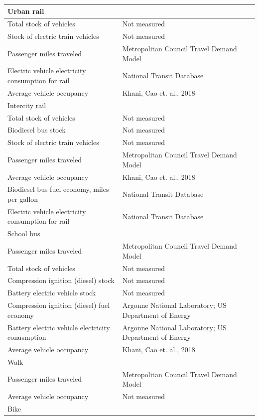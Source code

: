 \documentclass[
]{book}
\begin{document}
\begin{longtable}{ll}
\midrule
\multicolumn{2}{l}{Urban rail} \\ 
\midrule
Total stock of vehicles & Not measured \\ 
Stock of electric train vehicles & Not measured \\ 
Passenger miles traveled & Metropolitan Council Travel Demand Model \\ 
Electric vehicle electricity consumption for rail & National Transit Database \\ 
Average vehicle occupancy & Khani, Cao et. al., 2018 \\ 
\midrule
\multicolumn{2}{l}{Intercity rail} \\ 
\midrule
Total stock of vehicles & Not measured \\ 
Biodiesel bus stock & Not measured \\ 
Stock of electric train vehicles & Not measured \\ 
Passenger miles traveled & Metropolitan Council Travel Demand Model \\ 
Average vehicle occupancy & Khani, Cao et. al., 2018 \\ 
Biodiesel bus fuel economy, miles per gallon & National Transit Database \\ 
Electric vehicle electricity consumption for rail & National Transit Database \\ 
\midrule
\multicolumn{2}{l}{School bus} \\ 
\midrule
Passenger miles traveled & Metropolitan Council Travel Demand Model \\ 
Total stock of vehicles & Not measured \\ 
Compression ignition (diesel) stock & Not measured \\ 
Battery electric vehicle stock & Not measured \\ 
Compression ignition (diesel) fuel economy & Argonne National Laboratory; US Department of Energy \\ 
Battery electric vehicle electricity conusmption & Argonne National Laboratory; US Department of Energy \\ 
Average vehicle occupancy & Khani, Cao et. al., 2018 \\ 
\midrule
\multicolumn{2}{l}{Walk} \\ 
\midrule
Passenger miles traveled & Metropolitan Council Travel Demand Model \\ 
Average vehicle occupancy & Not measured \\ 
\midrule
\multicolumn{2}{l}{Bike} \\ 

\end{longtable}
\end{document}

